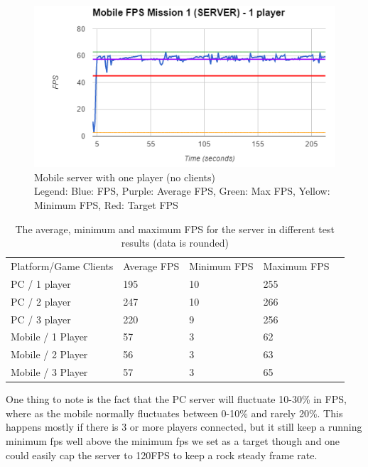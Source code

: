 \begin{figure}[H]
    \includegraphics[width=\textwidth]{figures/test/MobileServerOnePlayer}
    \caption{Mobile server with one player (no clients) \\ Legend: Blue: FPS, Purple: Average FPS, Green: Max FPS, Yellow: Minimum FPS, Red: Target FPS}
    \label{test:performance:mobileserverone}
\end{figure}

\begin{table}[h]
\begin{tabular}{lllll}
Platform/Game Clients & Average FPS & Minimum FPS & Maximum FPS &  \\
PC / 1 player         & 195         & 10          & 255         &  \\
PC / 2 player         & 247         & 10          & 266         &  \\
PC / 3 player         & 220         & 9           & 256         &  \\
Mobile / 1 Player     & 57          & 3           & 62          &  \\
Mobile / 2 Player     & 56          & 3           & 63          &  \\
Mobile / 3 Player     & 57          & 3           & 65          & 
\end{tabular}
\caption{The average, minimum and maximum FPS for the server in different test results (data is rounded) }\label{test:table:data}
\end{table}

One thing to note is the fact that the PC server will fluctuate 10-30\%  in FPS, where as the mobile normally fluctuates between 0-10\% and rarely 20\%. This happens mostly if there is 3 or more players connected, but it still keep a running minimum fps well above the minimum fps we set as a target though and one could easily cap the server to 120FPS to keep a rock steady frame rate.

